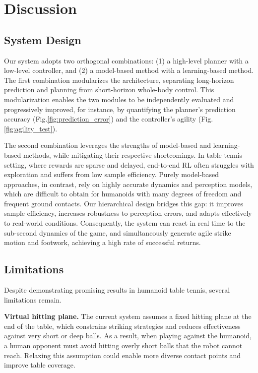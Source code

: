 \section{Discussion}
\label{disc-sec}
\subsection{System Design}
Our system adopts two orthogonal combinations: (1) a high-level planner with a low-level controller, and (2) a model-based method with a learning-based method. The first combination modularizes the architecture, separating long-horizon prediction and planning from short-horizon whole-body control.
This modularization enables the two modules to be independently evaluated and progressively improved, for instance, by quantifying the planner’s prediction accuracy (Fig.\ref{fig:prediction_error}) and the controller’s agility (Fig.\ref{fig:agility_test}).

The second combination leverages the strengths of model-based and learning-based methods, while mitigating their respective shortcomings.
In table tennis setting, where rewards are sparse and delayed, end-to-end RL often struggles with exploration and suffers from low sample efficiency. 
Purely model-based approaches, in contrast, rely on highly accurate dynamics and perception models, which are difficult to obtain for humanoids with many degrees of freedom and frequent ground contacts. 
Our hierarchical design bridges this gap: it improves sample efficiency, increases robustness to perception errors, and adapts effectively to real-world conditions. Consequently, the system can react in real time to the sub-second dynamics of the game, and simultaneously generate agile strike motion and footwork, achieving a high rate of successful returns.

\subsection{Limitations}
Despite demonstrating promising results in humanoid table tennis, several limitations remain.

\textbf{Virtual hitting plane.} The current system assumes a fixed hitting plane at the end of the table, which constrains striking strategies and reduces effectiveness against very short or deep balls. As a result, when playing against the humanoid, a human opponent must avoid hitting overly short balls that the robot cannot reach. Relaxing this assumption could enable more diverse contact points and improve table coverage.

